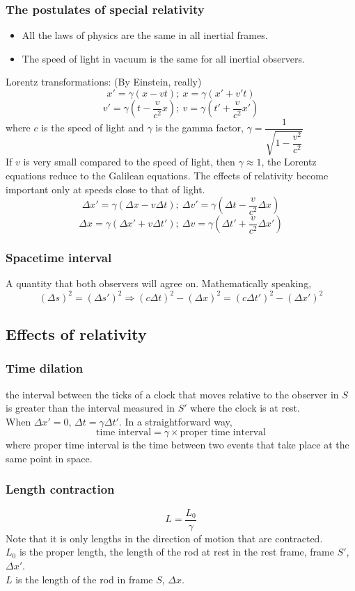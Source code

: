 \subsubsection*{The postulates of special relativity}
\begin{itemize}
  \item All the laws of physics are the same in all inertial frames.
  \item The speed of light in vacuum is the same for all inertial observers.
\end{itemize}
Lorentz transformations: (By Einstein, really)
\[x'=\gamma (x-vt);\ x=\gamma(x'+v't)\]
\[v'=\gamma\left(t-\dfrac{v}{c^2}x\right);\ v=\gamma\left(t'+\dfrac{v}{c^2}x'\right)\]
where $c$ is the speed of light and $\gamma$ is the gamma factor, $\displaystyle \gamma=\dfrac{1}{\sqrt{1-\dfrac{v^2}{c^2}}}$
\\If $v$ is very small
compared to the speed of light, then $\gamma\approx1$, the Lorentz equations reduce to
the Galilean equations. The effects of relativity become important only at speeds close to that of light.
\[\Delta x'=\gamma(\Delta x-v\Delta t);\ \Delta v'=\gamma(\Delta t-\dfrac{v}{c^2}\Delta x)\]
\[\Delta x=\gamma(\Delta x'+v\Delta t');\ \Delta v=\gamma(\Delta t'+\dfrac{v}{c^2}\Delta x')\]
\subsubsection*{Spacetime interval}
A quantity that both observers will agree on. Mathematically speaking,
\[(\Delta s)^2=(\Delta s')^2 \Rightarrow (c\Delta t)^2-(\Delta x)^2=(c\Delta t')^2-(\Delta x')^2\]
\subsection{Effects of relativity}
\subsubsection*{Time dilation} the interval between the ticks of a clock that moves relative to the observer in $S$ is greater than the interval measured in $S'$ where the clock is at rest.\\
When $\Delta x'=0$, $\Delta t=\gamma \Delta t'$. In a straightforward way,
\[\text{time interval}=\gamma\times \text{proper time interval}\]
where proper time interval is the time between two events that take place at the same point in space.
\subsubsection*{Length contraction}
\[L=\dfrac{L_0}{\gamma}\]
Note that it is only lengths in the direction of motion that are contracted.\\
$L_0$ is the proper length, the length of the rod at rest in the rest frame, frame $S'$, $\Delta x'$.\\
$L$ is the length of the rod in frame $S$, $\Delta x$.
